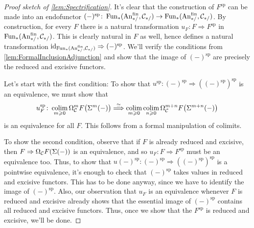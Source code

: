 \begin{proof}[Proof sketch of \cref{lem:Spectrification}]
	It's clear that the construction of $F^\mathrm{sp}$ can be made into an endofunctor $(-)^\mathrm{sp}\colon \Fun_*(\FinAn,\Cc_{*/})\rightarrow \Fun_*(\FinAn,\Cc_{*/})$. By construction, for every $F$ there is a natural transformation $u_F\colon F\Rightarrow F^\mathrm{sp}$ in $\Fun_*(\FinAn,\Cc_{*/})$. This is clearly natural in $F$ as well, hence defines a natural transformation $\id_{\Fun_*(\FinAn,\Cc_{*/})}\Rightarrow (-)^\mathrm{sp}$. We'll verify the conditions from \cref{lem:FormalInclusionAdjunction} and show that the image of $(-)^\mathrm{sp}$ are precisely the reduced and excisive functors.
	
	Let's start with the first condition: To show that $u^\mathrm{sp}\colon (-)^\mathrm{sp}\Rightarrow ((-)^\mathrm{sp})^\mathrm{sp}$ is an equivalence, we must show that
	\begin{equation*}
		u_F^\mathrm{sp}\colon \operatorname*{colim}_{m\geqslant 0}\Omega_{\mathcal{C}}^m F\bigl(\Sigma^m(-)\bigr)\overset{\simeq}{\Longrightarrow} \operatorname*{colim}_{m\geqslant 0}\operatorname*{colim}_{n\geqslant 0}\Omega_{\mathcal{C}}^{m+n}F\bigl(\Sigma^{m+n}(-)\bigr)
	\end{equation*}
	is an equivalence for all $F$. This follows from a formal manipulation of colimits.
	
	To show the second condition, observe that if $F$ is already reduced and excisive, then $F\Rightarrow \Omega_{\mathcal{C}} F(\Sigma(-))$ is an equivalence, and so $u_F\colon F\Rightarrow F^\mathrm{sp}$ must be an equivalence too. Thus, to show that $u(-)^\mathrm{sp}\colon (-)^\mathrm{sp}\Rightarrow ((-)^\mathrm{sp})^\mathrm{sp}$ is a pointwise equivalence, it's enough to check that $(-)^\mathrm{sp}$ takes values in reduced and excisive functors. This has to be done anyway, since we have to identify the image of $(-)^\mathrm{sp}$. Also, our observation  that $u_F$ is an equivalence whenever $F$ is reduced and excisive already shows that the essential image of $(-)^\mathrm{sp}$ contains all reduced and excisive functors. Thus, once we show that the $F^\mathrm{sp}$ is reduced and excisive, we'll be done.
	

\end{proof}
